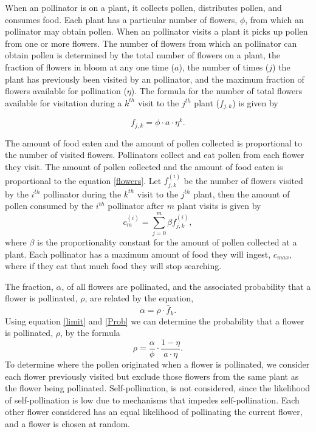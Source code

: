 When an pollinator is on a plant, it collects pollen, distributes pollen, and consumes food. Each
plant has a particular number of flowers, $\phi$, from which an pollinator may obtain pollen. When an pollinator
visits a plant it picks up pollen from one or more flowers. The number of flowers from which an
pollinator can obtain pollen is determined by the total number of flowers on a plant, the fraction of
flowers in bloom at any one time ($a$), the number of times ($j$) the plant has previously been
visited by an pollinator, and the maximum fraction of flowers available for pollination ($\eta$). The
formula for the number of total flowers available for visitation during a $k^{th}$ visit to the
$j^{th}$ plant ($f_{j,k}$) is given by

\begin{equation}\label{flowers}
f_{j,k} = \phi \cdot a \cdot \eta^k.
\end{equation}

The amount of food eaten and the amount of pollen collected is proportional to
the number of visited flowers. Pollinators collect and eat pollen from each flower they
visit.  The amount of pollen collected and the amount of food eaten is proportional to the
equation \eqref{flowers}. Let $f^{\left(i\right)}_{j,k}$ be the number of flowers visited by the
$i^{th}$ pollinator during the $k^{th}$ visit to the $j^{th}$ plant, then the amount of pollen consumed
by the $i^{th}$ pollinator after $m$ plant visits is given by
\begin{equation}
c^{\left(i\right)}_m = \sum_{j=0}^{m} \beta f^{\left(i\right)}_{j,k},
\label{limit}
\end{equation}
where $\beta$ is the proportionality constant for the amount of pollen collected at a plant.
Each pollinator has a maximum amount of food they will ingest, $c_{max}$, where if they eat that much food they will stop
searching. %

The fraction, $\alpha$, of all flowers are pollinated, and the associated probability that a
flower is pollinated, $\rho$, are related by the equation,
\begin{equation} \label{Prob}
\alpha = \rho \cdot \hat{f}_k.
\end{equation}
Using equation \eqref{limit} and \eqref{Prob} we can determine the probability that a flower is
pollinated, $\rho$, by the formula
\begin{equation*}
\rho = \frac{\alpha}{\phi} \cdot \frac{1 - \eta}{a \cdot \eta}.
\end{equation*}
To determine where the pollen originated when a flower is pollinated, we consider each flower previously visited but exclude those flowers from the same plant as the flower being pollinated.    Self-pollination, is not considered, since the likelihood of
self-pollination is low due to mechanisms that impedes self-pollination. Each other flower considered
has an equal likelihood of pollinating the current flower, and a flower is chosen at random.

